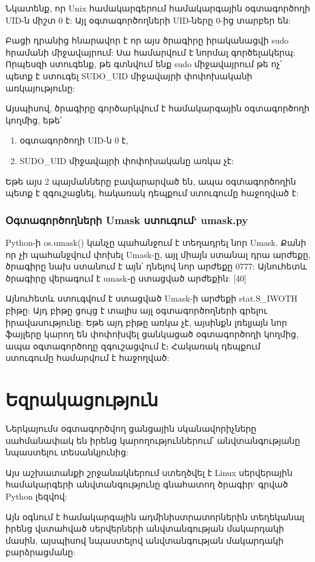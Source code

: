 \documentclass[a4paper,12pt]{article}
\begin{document}
\begin{sloppypar}
Նկատենք, որ Unix համակարգերում համակարգային օգտագործողի UID-ն միշտ 0 է:
Այլ օգտագործողների UID-ները 0-ից տարբեր են:

Բացի դրանից հնարավոր է որ այս ծրագիրը իրականացվի sudo հրամանի միջավայրում:
Սա համարվում է նորմալ գործելակերպ: Որպեսզի ստուգենք, թե գտնվում ենք sudo
միջավայրում թե ոչ՝ պետք է ստուգել SUDO\_UID միջավայրի փոփոխականի
առկայությունը:

Այսպիսով, ծրագիրը գործարկվում է համակարգային օգտագործողի կողմից, եթե՝
\begin{enumerate}
\item օգտագործողի UID-ն 0 է,
\item SUDO\_UID միջավայրի փոփոխականը առկա չէ:
\end{enumerate}

Եթե այս 2 պայմանները բավարարված են, ապա օգտագործողին պետք է զգուշացնել,
հակառակ դեպքում ստուգումը հաջողված է:


\subsubsection{Օգտագործողների Umask ստուգում` umask.py}


Python-ի os.umask() կանչը պահանջում է տեղադրել նոր Umask.
Քանի որ չի պահանջվում փոխել Umask-ը, այլ միայն ստանալ դրա արժեքը,
ծրագիրը նախ ստանում է այն՝ դնելով նոր արժեքը 0777: Այնուհետև
ծրագիրը վերագում է umask֊ը ստացված արժեքին: [40]

Այնուհետև ստուգվում է ստացված Umask-ի արժեքի stat.S\_IWOTH բիթը:
Այդ բիթը ցույց է տալիս այլ օգտագործողների գրելու իրավասությունը:
Եթե այդ բիթը առկա չէ, այսինքն լռելյայն նոր ֆայլերը կարող են
փոփոխվել ցանկացած օգտագործողի կողմից, ապա օգտագործողը զգուշացվում է։
Հակառակ դեպքում ստուգումը համարվում է հաջողված:


\newpage
\section{Եզրակացություն}


Ներկայումս օգտագործվող ցանցային սկանավորիչները սահմանափակ են
իրենց կարողություններում՝ անվտանգությանը նպաստելու
տեսանկյունից:

Այս աշխատանքի շրջանակներում ստեղծվել է Linux սերվերային
համակարգերի անվտանգությունը գնահատող
ծրագիր` գրված Python լեզվով:

Այն օգնում է համակարգային ադմինիստրատորներին տեղեկանալ
իրենց վստահված սերվերների անվտանգության մակարդակի մասին,
այսպիսով նպաստելով անվտանգության մակարդակի բարձրացմանը:


\end{sloppypar}
\end{document}
